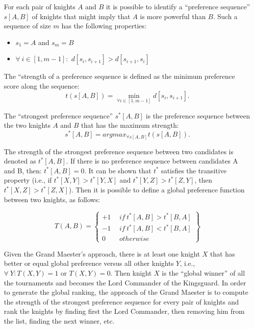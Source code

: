 \documentclass[11pt]{article}
\begin{document}
\noindent For each pair of knights $A$ and $B$ it is possible to
identify a ``preference sequence'' $s[A,B]$ of knights that might
imply that $A$ is more powerful than $B$. Such a sequence of size $m$
has the following properties:
\begin{itemize}
\item $s_1 = A$ and $s_m = B$
\item $\forall\ i \in [1,m-1]:$ $d[s_i,s_{i+1}] > d[s_{i+1},s_i]$
\end{itemize}
\noindent The ``strength of a preference sequence is defined as the
minimum preference score along the sequence: $$ t( s[A,B] ) =
\min_{\forall i \in [1,m-1]} d[s_i,s_{i+1}].$$ 

\noindent The ``strongest preference sequence'' $s^*[A,B]$ is the
preference sequence between the two knights $A$ and $B$ that has the
maximum strength:
$$s^*[A,B] = argmax_{\forall s[A,B]} t( s[A,B] ).$$ 

\noindent The strength of the strongest preference sequence between
two candidates is denoted as $t^*[A,B]$. If there is no preference
sequence between candidates A and B, then: $t^*[A,B] = 0$. It can be
shown that $t^*$ satisfies the transitive property (i.e., if $t^*[X,Y]
> t^*[Y,X]$ and $t^*[Y,Z] > t^*[Z,Y]$, then $t^*[X,Z] >
t^*[Z,X]$). Then it is possible to define a global preference function
between two knights, as follows:\vspace{-.2in}

\begin{equation*}
T(A,B)=\left\{
\begin{matrix}+1\ &\ if\ t^*[A,B]>t^*[B,A]\\
-1\ &\ if\ t^*[A,B]<t^*[B,A]\\
0\ &\ otherwise
\end{matrix}
\right\}
\end{equation*}

\noindent Given the Grand Maester's approach, there is at least one
knight $X$ that has better or equal global preference versus all other
knights $Y$, i.e., $\forall\ Y: T(X,Y) = 1$ or $T(X,Y)=0$. Then knight
$X$ is the ``global winner'' of all the tournaments and becomes the
Lord Commander of the Kingsguard.  In order to generate the global
ranking, the approach of the Grand Maester is to compute the strength
of the strongest preference sequence for every pair of knights and
rank the knights by finding first the Lord Commander, then removing
him from the list, finding the next winner, etc.\\
\end{document}

